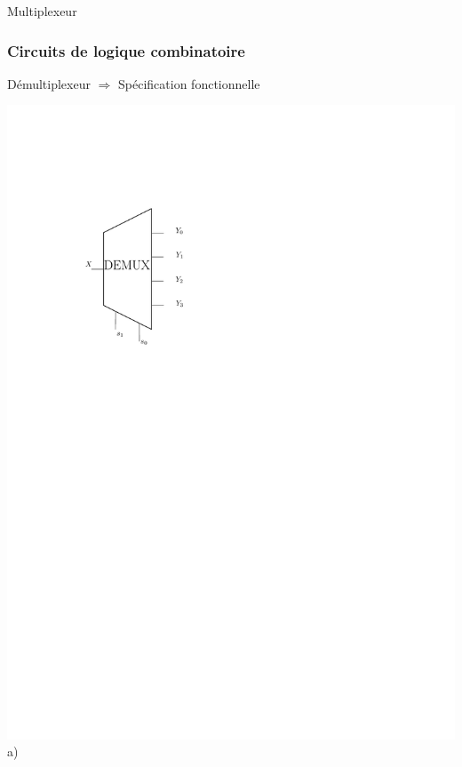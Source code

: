 \documentclass{beamer}
\begin{document}
\begin{frame}
\begin{block}{Multiplexeur}
\begin{minipage}[c]{.46\linewidth}
   \end{minipage}
\end{block}
\end{frame}

\begin{frame}
\frametitle{Circuits de logique combinatoire}
\begin{block}{Démultiplexeur}
$\Rightarrow$ Spécification fonctionnelle\\

   \begin{minipage}[c]{.46\linewidth}
\includegraphics[width=0.5\linewidth]{Figs/demux.pdf} \\\centering a)
   \end{minipage} \hfill
   \begin{minipage}[c]{.46\linewidth}

\end{minipage}
\end{block}
\end{frame}
\end{document}
